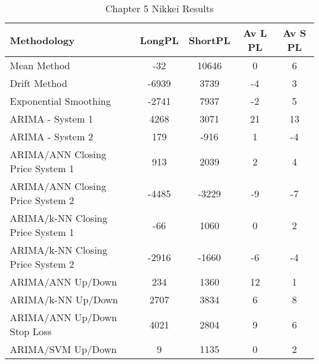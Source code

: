 \begin{table}[ht]
\centering
\caption[Chapter 5 Nikkei Results]{Chapter 5 Nikkei Results} 
\label{tab:chp6:nik2_summary}
\begin{tabular}{lcccc}
  \toprule Methodology & LongPL & ShortPL & Av L PL & Av S PL \\ 
  \midrule Mean Method & -32 & 10646 & 0 & 6 \\ 
  Drift Method & -6939 & 3739 & -4 & 3 \\ 
  Exponential Smoothing & -2741 & 7937 & -2 & 5 \\ 
  ARIMA - System 1 & 4268 & 3071 & 21 & 13 \\ 
  ARIMA - System 2 & 179 & -916 & 1 & -4 \\ 
  ARIMA/ANN Closing Price System 1 & 913 & 2039 & 2 & 4 \\ 
  ARIMA/ANN Closing Price System 2 & -4485 & -3229 & -9 & -7 \\ 
  ARIMA/k-NN Closing Price System 1 & -66 & 1060 & 0 & 2 \\ 
  ARIMA/k-NN Closing Price System 2 & -2916 & -1660 & -6 & -4 \\ 
  ARIMA/ANN Up/Down & 234 & 1360 & 12 & 1 \\ 
  ARIMA/k-NN Up/Down & 2707 & 3834 & 6 & 8 \\ 
  ARIMA/ANN Up/Down Stop Loss & 4021 & 2804 & 9 & 6 \\ 
  ARIMA/SVM Up/Down & 9 & 1135 & 0 & 2 \\ 
   \bottomrule \end{tabular}
\end{table}
